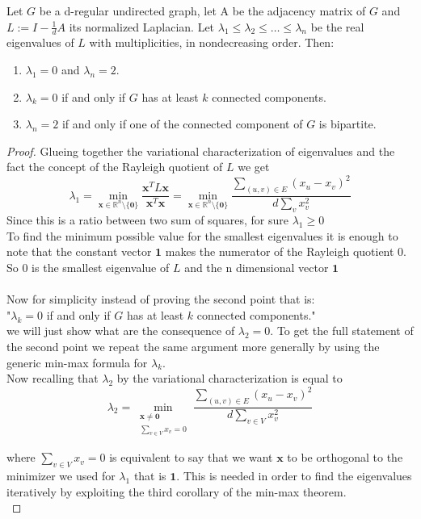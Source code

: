 \begin{theorem}
Let $ G $ be a d-regular undirected graph, let A be the adjacency matrix of $ G $ and $ L:= I-\frac{1}{d}A $ its normalized Laplacian. Let  $\lambda_1 \leq \lambda_2 \leq \dots \leq \lambda_n$ be the real eigenvalues of $ L $ with multiplicities, in nondecreasing order. Then:
\begin{enumerate}
\item $ \lambda_1=0 $ and $ \lambda_n=2 $.
\item $ \lambda_k=0 $ if and only if $ G $ has at least $ k $ connected components.
\item $ \lambda_n=2 $ if and only if one of the connected component of $ G $ is bipartite.
\end{enumerate}
\begin{proof}
Glueing together the variational characterization of eigenvalues and the fact the concept of the Rayleigh quotient of $ L $ we get
\[\lambda_1 
= \min_{\mathbf{x} \in \mathbb{R}^n \setminus \{\mathbf{0}\}}\frac{\mathbf{x}^TL\mathbf{x}}{\mathbf{x}^T\mathbf{x}} 
=  \min_{\mathbf{x} \in \mathbb{R}^n \setminus \{\mathbf{0}\}} \frac{\sum_{(u,v) \in E}{(x_u - x_v)^2}}{d \sum_{v}{x_v^2}}\]
Since this is a ratio between two sum of squares, for sure $\lambda_1 \geq 0 $ \\
To find the minimum possible value for the smallest eigenvalues it is enough to note that the constant vector $ \mathbf{1} $ makes the numerator of the Rayleigh quotient $ 0 $. So $ 0 $ is the smallest eigenvalue of $ L $ and the n dimensional vector $ \mathbf{1} $
\\
\medskip
\\
Now for simplicity instead of proving  the second point that is: 
\\ \medskip
"$ \lambda_k=0 $ if and only if $ G $ has at least $ k $ connected components."
\\
we will just show what are the consequence of $ \lambda_2=0 $.
To get the full statement of the second point we repeat the same argument more generally by using the generic min-max formula for $ \lambda_k $. 
\\
Now recalling that $ \lambda_2 $ by the variational characterization is equal to
\[\lambda_2 = \min_{\substack{\mathbf{x} \ne \mathbf{0} \\ \sum_{v \in V} x_v = 0}}  \frac{\sum_{(u,v)\in E}(x_u-x_v)^2}{d \sum_{v \in V} x_v^2 } \]

where $ {\sum_{v \in V} x_v = 0} $ is equivalent to say that we want $ \mathbf{x} $ to be orthogonal to the minimizer we used for $ \lambda_1 $ that is 
$ \mathbf{1} $. This is needed in order to find the eigenvalues iteratively by exploiting the third corollary of the min-max theorem. \\


\end{proof}
\end{theorem}
